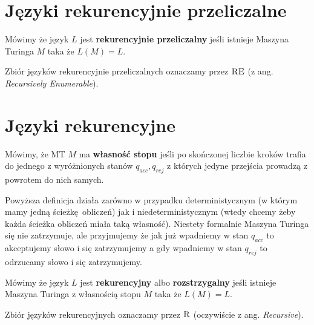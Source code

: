 \section {Języki rekurencyjnie przeliczalne}

\begin{definition}
	Mówimy że język \( L \) jest \textbf{rekurencyjnie przeliczalny} jeśli istnieje Maszyna Turinga \( M \) taka że \( L(M) = L \).

	Zbiór języków rekurencyjnie przeliczalnych oznaczamy przez \textbf{\( \textsc{RE} \)} (z ang. \textit{Recursively Enumerable}).
\end{definition}

\section {Języki rekurencyjne}

\begin{definition}
	Mówimy, że MT \( M \) ma \textbf{własność stopu} jeśli po skończonej liczbie kroków trafia do jednego z wyróżnionych stanów \( q_{acc}, q_{rej} \) z których jedyne przejścia prowadzą z powrotem do nich samych.
\end{definition}

Powyższa definicja działa zarówno w przypadku deterministycznym (w którym mamy jedną ścieżkę obliczeń) jak i niedeterministycznym (wtedy chcemy żeby każda ścieżka obliczeń miała taką własność).
Niestety formalnie Maszyna Turinga się nie zatrzymuje, ale przyjmujemy że jak już wpadniemy w stan \( q_{acc} \) to akceptujemy słowo i się zatrzymujemy a gdy wpadniemy w stan \( q_{rej} \) to odrzucamy słowo i się zatrzymujemy.

\begin{definition}
	Mówimy że język \( L \) jest \textbf{rekurencyjny} albo \textbf{rozstrzygalny} jeśli istnieje Maszyna Turinga z własnością stopu \( M \) taka że \( L(M) = L \).

	Zbiór języków rekurencyjnych oznaczamy przez \textbf{\( \textsc{R} \)} (oczywiście z ang. \textit{Recursive}).
\end{definition}